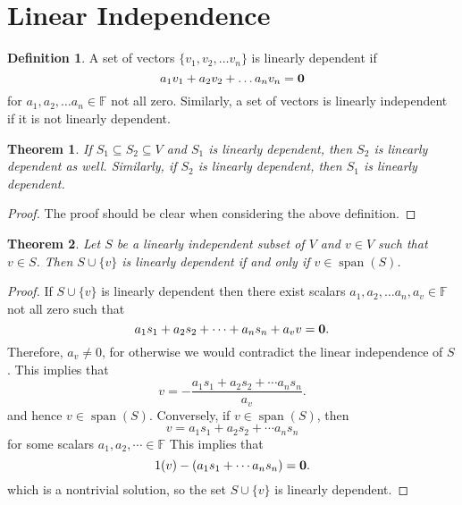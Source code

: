 \documentclass[oneside, 12pt]{book}
\DeclareMathOperator{\spn}{span}
\newtheorem{thm}{Theorem}[section]
\theoremstyle{definition}
\newtheorem{defn}{Definition}[section]
\begin{document}
\section{Linear Independence}
\begin{defn}
  \label{defn_linind}
  A set of vectors $\{v_{1}, v_{2}, \dots v_{n}\}$ is linearly dependent if
  \[a_{1}v_{1}+a_{2}v_{2}+ \dots a_{n}v_{n}=\bold{0}\] for $a_{1}, a_{2}, \dots a_{n} \in \mathbb{F}$ not all zero. Similarly, a set of vectors is linearly independent if it is not linearly dependent.
\end{defn}
\begin{thm}
  \label{thm_linind}
If $S_{1}\subseteq S_{2} \subseteq V$ and $S_{1}$ is linearly dependent, then $S_{2}$ is linearly dependent as well. Similarly, if $S_{2}$ is linearly dependent, then $S_{1}$ is linearly dependent.
\end{thm}
\begin{proof}
The proof should be clear when considering the above definition.
\end{proof}
\begin{thm}
  \label{thm_span}
Let $S$ be a linearly independent subset of $V$ and $v \in V$ such that $v \in S$. Then $S \cup \{v\}$ is linearly dependent if and only if $v \in \spn(S)$.
\end{thm}
\begin{proof}
  If $S \cup \{v\}$ is linearly dependent then there exist scalars $a_{1}, a_{2}, \dots a_{n}, a_{v} \in \mathbb{F}$ not all zero such that \[a_{1}s_{1} +a_{2}s_{2}+\cdots +a_{n}s_{n}+a_{v}v=\bold{0}.\]
  Therefore, $a_{v}\neq0$, for otherwise we would contradict the linear independence of $S$. This implies that \[v=-\frac{a_{1}s_{1}+ a_{2}s_{2}+ \cdots a_{n}s_{n}}{a_{v}}.\] and hence $v \in \spn(S)$. Conversely, if $v \in \spn(S)$, then \[v=a_{1}s_{1}+a_{2}s_{2}+\cdots a_{n}s_{n} \] for some scalars $a_{1},a_{2}, \cdots \in \mathbb{F}$ This implies that \[1(v)-(a_{1}s_{1}+\cdots a_{n}s_{n})=\bold{0}.\] which is a nontrivial solution, so the set $S \cup \{v\}$ is linearly dependent.
\end{proof}
\end{document}
